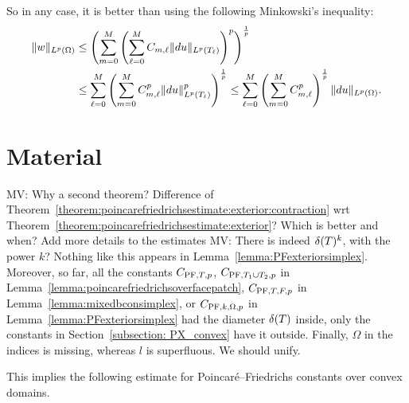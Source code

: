 \documentclass[10pt,a4paper]{article}
\newcommand{\mwl}[1]{{\color{red}#1}}
\begin{document}
    So in any case, it is better than using the following Minkowski's inequality: 
    \begin{align}
        \| w \|_{L^{p}(\Omega)}
        &
        \leq 
        \left( \sum_{m=0}^{M} \left( \sum_{\ell=0}^{M} C_{m,\ell} \| d u \|_{L^{p}(T_{\ell})} \right)^{p} \right)^{\frac 1 p}
        \\&
        \leq 
        \sum_{\ell=0}^{M}
        \left( \sum_{m=0}^{M} C_{m,\ell}^{p} \| d u \|_{L^{p}(T_{\ell})}^{p} \right)^{\frac 1 p}
        \leq 
        \sum_{\ell=0}^{M}
        \left( \sum_{m=0}^{M} C_{m,\ell}^{p} \right)^{\frac 1 p}
        \| d u \|_{L^{p}(\Omega)}
        .
    \end{align}


















    




\section{Material}

\mwl{MV: Why a second theorem? Difference of Theorem~\ref{theorem:poincarefriedrichsestimate:exterior:contraction} wrt Theorem~\ref{theorem:poincarefriedrichsestimate:exterior}? Which is better and when? Add more details to the estimates}
\mwl{MV: There is indeed ${\delta}(T)^{k}$, with the power $k$? Nothing like this appears in Lemma~\ref{lemma:PFexteriorsimplex}. Moreover, so far, all the constants $C_{{{\rm PF}},T,p}$, $C_{{{\rm PF}},T_1 \cup T_2,p}$ in Lemma~\ref{lemma:poincarefriedrichsoverfacepatch}, $C_{{\rm PF},T,F,p}$ in Lemma~\ref{lemma:mixedbconsimplex}, or $C_{{{\rm PF}},k,\Omega,p}$ in Lemma~\ref{lemma:PFexteriorsimplex} had the diameter ${\delta}(T)$ inside, only the constants in Section~\ref{subsection: PX_convex} have it outside. Finally, $\Omega$ in the indices is missing, whereas $l$ is superfluous. We should unify.}





This implies the following estimate for Poincar\'e--Friedrichs constants over convex domains. 
\end{document}
